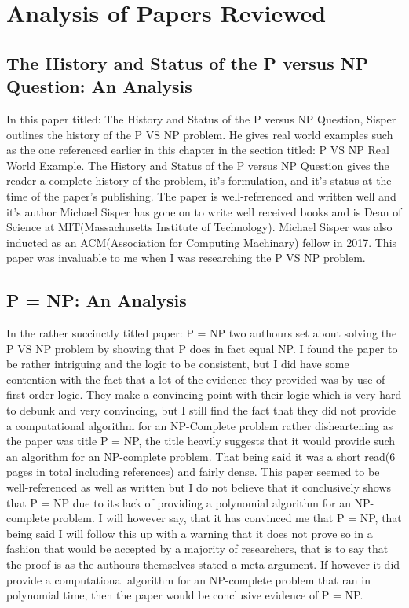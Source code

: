 \documentclass{report}
\begin{document}
\section{Analysis of Papers Reviewed}
\subsection{The History and Status of the P versus NP Question: An Analysis}
In this paper titled: The History and Status of the P versus NP Question\cite{HistoryOfPVsNP}, Sisper outlines the history of the P VS NP problem.  He gives real world examples such as the one referenced earlier in this chapter in the section titled: P VS NP Real World Example.  The History and Status of the P versus NP Question gives the reader a complete history of the problem, it's formulation, and it's status at the time of the paper's publishing.  The paper is well-referenced and written well and it's author Michael Sisper has gone on to write well received books\cite{Sisperbib} and is Dean of Science at MIT(Massachusetts Institute of Technology)\cite{Sisperdean}.  Michael Sisper was also inducted as an ACM(Association for Computing Machinary) fellow in 2017\cite{Sisperacm}. This paper was invaluable to me when I was researching the P VS NP problem.
\subsection{P = NP: An Analysis}
In the rather succinctly titled paper: P = NP\cite{PVsNPSolved} two authours set about solving the P VS NP problem by showing that P does in fact equal NP.  I found the paper to be rather intriguing and the logic to be consistent, but I did have some contention with the fact that a lot of the evidence they provided was by use of first order logic.  They make a convincing point with their logic which is very hard to debunk and very convincing, but I still find the fact that they did not provide a computational algorithm for an NP-Complete problem rather disheartening as the paper was title P = NP, the title heavily suggests that it would provide such an algorithm for an NP-complete problem.  That being said it was a short read(6 pages in total including references) and fairly dense.  This paper seemed to be well-referenced as well as written but I do not believe that it conclusively shows that P = NP due to its lack of providing a polynomial algorithm for an NP-complete problem.  I will however say, that it has convinced me that P = NP, that being said I will follow this up with a warning that it does not prove so in a fashion that would be accepted by a majority of researchers, that is to say that the proof is as the authours themselves stated a meta argument.  If however it did provide a computational algorithm for an NP-complete problem that ran in polynomial time, then the paper would be conclusive evidence of P = NP.
\end{document}
